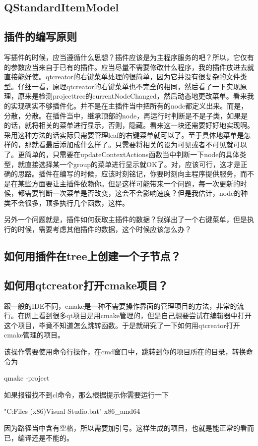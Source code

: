 \subsection{QStandardItemModel}
\subsection{插件的编写原则}
写插件的时候，应当遵循什么思想？插件应该是为主程序服务的吧？所以，它仅有的参数应当来自于已有的插件。应当尽量不需要修改什么程序，我的插件放进去就直接能好使。qtcreator的右键菜单处理的很简单，因为它并没有很复杂的文件类型。仔细一看，原理qtcreator的右键菜单也不完全的相同，然后看了一下实现原理，原来是检测projecttree的currentNodeChanged，然后动态地更改菜单。看来我的实现确实不够插件化。并不是在主插件当中把所有的node都定义出来。而是，分散，分散。在插件当中，继承顶部的node，再运行时判断是不是子类，如果是的话，就将相关的菜单进行显示，否则，隐藏。看来这一块还需要好好地实现啊。采用这种方法的话实际只需要管理leaf的右键菜单就可以了。至于具体地菜单是怎样的，那就看最后添加成什么样了。只需要将相关的设为可见或者不可见就可以了。更简单的，只需要在updateContextActions函数当中判断一下node的具体类型，就直接选择某一个group的菜单进行显示就OK了。对，应该可行，这才是正确的思路。插件在编写的时候，应该时刻铭记，你要时刻向主程序提供服务，而不是在某些方面要让主插件依赖你。但是这样可能带来一个问题，每一次更新的时候，都需要判断一次菜单是否改变，这会不会影响速度？但是我估计，node的种类不会很多，顶多执行几个函数，这样。

另外一个问题就是，插件如何获取主插件的数据？我弹出了一个右键菜单，但是执行的时候，需要考虑其他插件的数据，这个时候应该怎么办？
\subsection{如何用插件在tree上创建一个子节点？}
\subsection{如何用qtcreator打开cmake项目？}
跟一般的IDE不同，cmake是一种不需要操作界面的管理项目的方法，非常的流行。在网上看到很多qt项目是用cmake管理的，但是自己想要尝试在编辑器中打开这个项目，毕竟不知道怎么跳转函数。于是就研究了一下如何用qtcreator打开cmake管理的项目。

该操作需要使用命令行操作，在cmd窗口中，跳转到你的项目所在的目录，转换命令为

qmake -project

如果报错找不到cl命令，那么根据提示你需要运行一下
\begin{listlsting}
"C:\Program Files (x86)\Microsoft Visual Studio\Community\VC\Auxiliary\Build\vcvarsall.bat" x86_amd64    
\end{listlsting}
因为路径当中含有空格，所以需要加引号。这样生成的项目，也就是能正常的看而已，编译还是不能的。
